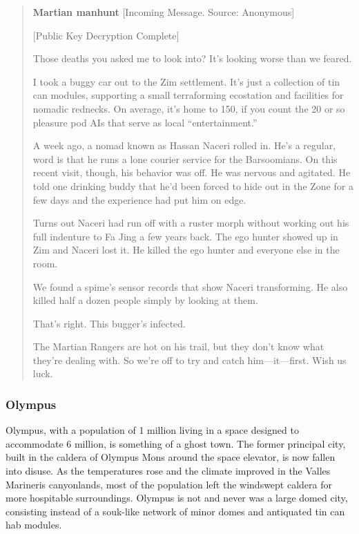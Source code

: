 \begin{quotation}
\textbf{Martian manhunt}  [Incoming Message. Source: Anonymous] 

 [Public Key Decryption Complete] 

 Those deaths you asked me to look into? It’s looking worse than we feared. 

 I took a buggy car out to the Zim settlement. It’s just a collection of tin can modules, supporting a small terraforming ecostation and facilities for nomadic rednecks. On average, it’s home to 150, if you count the 20 or so pleasure pod AIs that serve as local “entertainment.” 

 A week ago, a nomad known as Hassan Naceri rolled in. He’s a regular, word is that he runs a lone courier service for the Barsoomians. On this recent visit, though, his behavior was off. He was nervous and agitated. He told one drinking buddy that he’d been forced to hide out in the Zone for a few days and the experience had put him on edge. 

 Turns out Naceri had run off with a ruster morph without working out his full indenture to Fa Jing a few years back. The ego hunter showed up in Zim and Naceri lost it. He killed the ego hunter and everyone else in the room. 

 We found a spime’s sensor records that show Naceri transforming. He also killed half a dozen people simply by looking at them. 

 That’s right. This bugger’s infected. 

 The Martian Rangers are hot on his trail, but they don’t know what they’re dealing with. So we’re off to try and catch him—it—first. Wish us luck.
\end{quotation} 

\subsubsection{Olympus}
\label{sec:olympus} 

Olympus, with a population of 1 million living in a space designed to accommodate 6 million, is something of a ghost town. The former principal city, built in the caldera of Olympus Mons around the space elevator, is now fallen into disuse. As the temperatures rose and the climate improved in the Valles Marineris canyonlands, most of the population left the windswept caldera for more hospitable surroundings. Olympus is not and never was a large domed city, consisting instead of a souk-like network of minor domes and antiquated tin can hab modules. 

